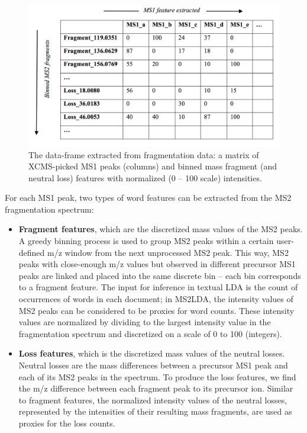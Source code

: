 \begin{figure}[!htbp]
\centering\includegraphics[width=0.8\linewidth]{07-lda/figures/matrix.png}
\centering\caption{The data-frame extracted from fragmentation data: a matrix of XCMS-picked MS1 peaks (columns) and binned mass fragment (and neutral loss) features with normalized (0 – 100 scale) intensities.\label{fig:m2lda-matrix}}
\end{figure}

For each MS1 peak, two types of word features can be extracted from the MS2 fragmentation spectrum:
\begin{itemize}
\item \textbf{Fragment features}, which are the discretized mass values of the MS2 peaks. A greedy binning process is used to group MS2 peaks within a certain user-defined m/z window from the next unprocessed MS2 peak. This way, MS2 peaks with close-enough m/z values but observed in different precursor MS1 peaks are linked and placed into the same discrete bin – each bin corresponds to a fragment feature. The input for inference in textual LDA is the count of occurrences of words in each document; in MS2LDA, the intensity values of MS2 peaks can be considered to be proxies for word counts. These intensity values are normalized by dividing to the largest intensity value in the fragmentation spectrum and discretized on a scale of 0 to 100 (integers). 
\item \textbf{Loss features}, which is the discretized mass values of the neutral losses. Neutral losses are the mass differences between a precursor MS1 peak and each of its MS2 peaks in the spectrum. To produce the loss features, we find the m/z difference between each fragment peak to its precursor ion. Similar to fragment features, the normalized intensity values of the neutral losses, represented by the intensities of their resulting mass fragments, are used as proxies for the loss counts.
\end{itemize}

